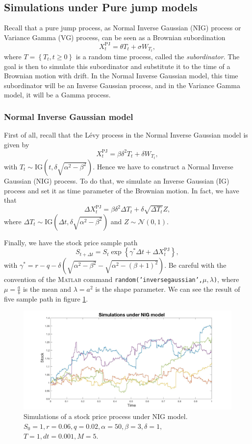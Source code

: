 \subsection{Simulations under Pure jump models}
Recall that a pure jump process, as Normal Inverse Gaussian (NIG) process or Variance Gamma (VG) process, can be seen as a Brownian subordination
$$X_t^\text{PJ} = \theta T_t + \sigma W_{T_t},$$
where $T=\left\{T_t,t\geq0\right\}$ is a random time process, called the \textit{subordinator}. The goal is then to simulate this subordinator and substitute it to the time of a Brownian motion with drift. In the Normal Inverse Gaussian model, this time subordinator will be an Inverse Gaussian process, and in the Variance Gamma model, it will be a Gamma process.

\subsubsection{Normal Inverse Gaussian model}
First of all, recall that the L\'evy process in the Normal Inverse Gaussian model is given by
$$X_t^\text{PJ} = \beta \delta^2 T_t + \delta W_{T_t},$$
with $T_t\sim \text{IG}\left(t,\delta \sqrt{\alpha^2-\beta^2}\right)$.
Hence we have to construct a Normal Inverse Gaussian (NIG) process. To do that, we simulate an Inverse Gaussian (IG) process and set it as time parameter of the Brownian motion. In fact, we have that
$$\Delta X_t^\text{PJ} = \beta\delta^2\Delta T_t+\delta \sqrt{\Delta T_t}Z, $$
where $\Delta T_t\sim\text{IG}\left(\Delta t, \delta \sqrt{\alpha^2-\beta^2}\right)$ and $Z\sim\mathcal{N}(0,1)$.

Finally, we have the stock price sample path
$$S_{t+\Delta t}=S_t\exp\left\{\gamma^\ast\Delta t + \Delta X_t^\text{PJ}\right\},$$
with $\gamma^\ast=r-q -\delta \left(\sqrt{\alpha^2-\beta^2}-\sqrt{\alpha^2-(\beta+1)^2}\right)$.
Be careful with the convention of the \textsc{Matlab} command \texttt{random('inversegaussian',$\mu,\lambda$)}, where $\mu = \frac{a}{b}$ is the mean and $\lambda = a^2$ is the shape parameter. We can see the result of five sample path in figure \ref{fig:MC:NIG}.
\begin{figure}[!htb]
	\includegraphics[width=\textwidth]{gfx/NIG_plot}
	\caption{Simulations of a stock price process under NIG model.\\ $S_0=1, r= 0.06,q = 0.02,\alpha = 50 , \beta = 3, \delta = 1,$\\$T = 1, dt = 0.001, M=5$.}
	\label{fig:MC:NIG}
\end{figure}
